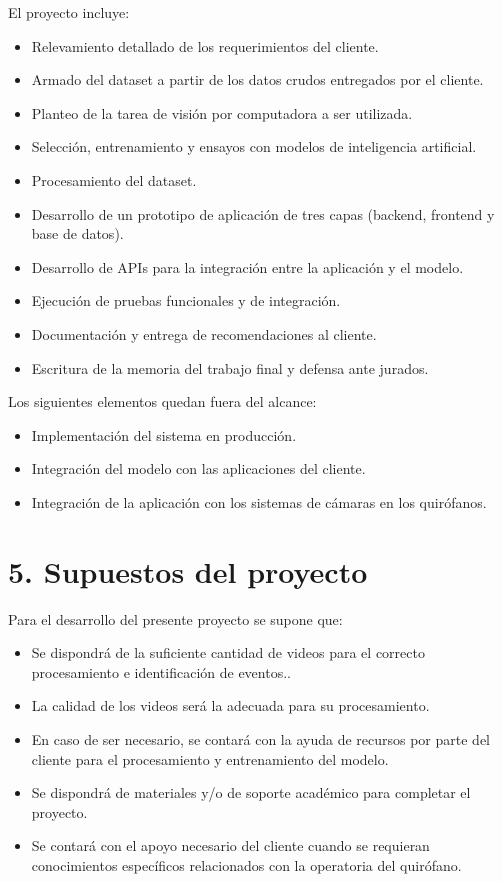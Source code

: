 \documentclass[
11pt, %
]{charter}
\begin{document}
El proyecto incluye:
\begin{itemize}
	\item Relevamiento detallado de los requerimientos del cliente.
	\item Armado del dataset a partir de los datos crudos entregados por el cliente.
	\item Planteo de la tarea de visión por computadora a ser utilizada. 
	\item Selección, entrenamiento y ensayos con modelos de inteligencia artificial.
	\item Procesamiento del dataset.
	\item Desarrollo de un prototipo de aplicación de tres capas (backend, frontend y base de datos).
	\item Desarrollo de APIs para la integración entre la aplicación y el modelo.
	\item Ejecución de pruebas funcionales y de integración.
	\item Documentación y entrega de recomendaciones al cliente.
	\item Escritura de la memoria del trabajo final y defensa ante jurados.
	
\end{itemize}

Los siguientes elementos quedan fuera del alcance:
\begin{itemize}
	\item Implementación del sistema en producción.
	\item Integración del modelo con las aplicaciones del cliente.
	\item Integración de la aplicación con los sistemas de cámaras en los quirófanos. 

\end{itemize}



\section{5. Supuestos del proyecto}
\label{sec:supuestos}

Para el desarrollo del presente proyecto se supone que: 

\begin{itemize}
	\item Se dispondrá de la suficiente cantidad de videos para el correcto procesamiento e identificación de eventos..
	\item La calidad de los videos será la adecuada para su procesamiento.
	\item En caso de ser necesario, se contará con la ayuda de recursos por parte del cliente para el procesamiento y entrenamiento del modelo.
	\item Se dispondrá de materiales y/o de soporte académico para completar el proyecto.
	\item Se contará con el apoyo necesario del cliente cuando se requieran conocimientos específicos relacionados con la operatoria del quirófano.
\end{itemize}
\end{document}
